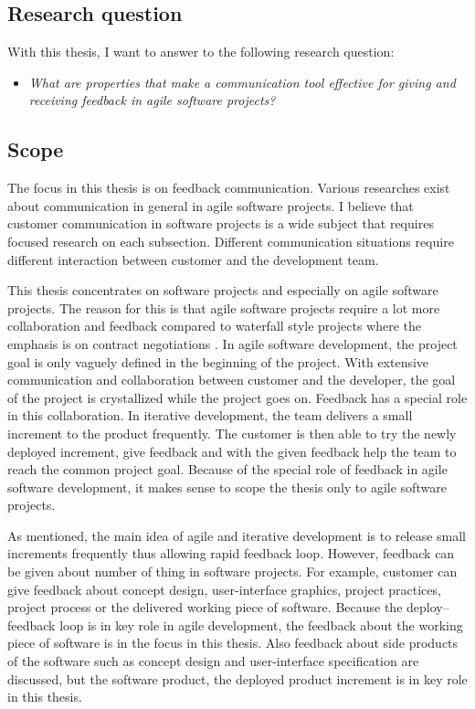 \documentclass[english,12pt,a4paper,pdftex]{article}
\begin{document}
\subsection{Research question}
\label{sec:research_question}

With this thesis, I want to answer to the following research question:

\begin{itemize}
\item \textit{What are properties that make a communication tool effective for giving and receiving feedback in agile software projects?}
\end{itemize}

\subsection{Scope}

The focus in this thesis is on feedback communication. Various researches exist about communication in general in agile software projects. I believe that customer communication in software projects is a wide subject that requires focused research on each subsection. Different communication situations require different interaction between customer and the development team. 

This thesis concentrates on software projects and especially on agile software projects. The reason for this is that agile software projects require a lot more collaboration and feedback compared to waterfall style projects where the emphasis is on contract negotiations \citep{larman2004}. In agile software development, the project goal is only vaguely defined in the beginning of the project. With extensive communication and collaboration between customer and the developer, the goal of the project is crystallized while the project goes on. Feedback has a special role in this collaboration. In iterative development, the team delivers a small increment to the product frequently. The customer is then able to try the newly deployed increment, give feedback and with the given feedback help the team to reach the common project goal. Because of the special role of feedback in agile software development, it makes sense to scope the thesis only to agile software projects.

As mentioned, the main idea of agile and iterative development is to release small increments frequently thus allowing rapid feedback loop. However, feedback can be given about number of thing in software projects. For example, customer can give feedback about concept design, user-interface graphics, project practices, project process or the delivered working piece of software. Because the deploy--feedback loop is in key role in agile development, the feedback about the working piece of software is in the focus in this thesis. Also feedback about side products of the software such as concept design and user-interface specification are discussed, but the software product, the deployed product increment is in key role in this thesis.
\end{document}
